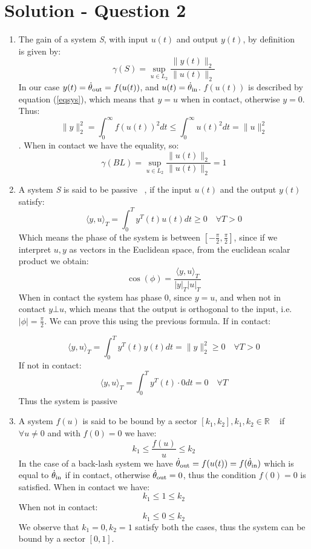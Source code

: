 \section*{Solution - Question 2}
\label{sec:sol2}
\begin{enumerate}
\item{
The gain of a system \textit{S}, with input $u(t)$ and output $y(t)$, by definition ~\cite[p. 209]{Khalil:2002:Nonlinear-systems:vh} is given by:
$$ \gamma(S) = \sup_{u \in L_2} \frac{\|y(t)\|_2}{\|u(t)\|_2}$$
In our case $y(t) = \operatorname{\dot{\theta}_\textrm{out}}=f(u(t))$, and $u(t) = \operatorname{\dot{\theta}_\textrm{in}}$. $f(u(t))$ is described by equation (\ref{eqsys}), which means that $y=u$ when in contact, otherwise $y=0$.
Thus: $$\|y\|_2^2 = \int_0^\infty f(u(t))^2 dt \leq \int_0^\infty u(t)^2 dt = \|u\|_2^2$$. When in contact we have the equality, so:
$$\gamma(BL) = \sup_{u \in L_2} \frac{\|u(t)\|_2}{\|u(t)\|_2} = 1$$}
\item{A system \emph{S} is said to be passive ~\cite[p. 227]{Khalil:2002:Nonlinear-systems:vh}, if the input $u(t)$ and the output $y(t)$ satisfy:
$$\langle y,u \rangle_T = \int_0^T y^T(t)u(t) dt \geq 0 \quad \forall
T > 0$$
Which means  the phase of the system is between $[-\frac{\pi}{2},\frac{\pi}{2}]$, since if we interpret $u,y$ as vectors in the Euclidean space, from the euclidean scalar product we obtain:
$$\cos(\phi)  = \frac{\langle y,u \rangle_T }{|y|_T|u|_T}$$
When in contact the system has phase $0$, since $y=u$, and when not in contact $y \bot u$, which means that the output is orthogonal to the input, i.e. $|\phi| = \frac{\pi}{2}$. We can prove this using the previous formula. If in contact:

$$\langle y,u \rangle_T = \int_0^T y^T(t)y(t) dt = \|y\|_2^2 \geq 0 \quad \forall
T > 0$$
If not in contact: 
$$\langle y,u \rangle_T = \int_0^T y^T(t)\cdot 0 dt =0 \quad \forall T$$
Thus the system is passive}
\item{A system $f(u)$ is said to be bound by a sector  $[k_1,k_2], k_1,k_2 \in \mathbb{R}$ ~\cite[p. 264]{Khalil:2002:Nonlinear-systems:vh} if $\forall u \neq 0$ and with $f(0)=0$ we have:
$$k_1 \leq \frac{f(u)}{u} \leq k_2 $$
In the case of a back-lash system we have $\operatorname{\dot{\theta}_\textrm{out}}=f(u(t))=f(\operatorname{\dot{\theta}_\textrm{in}})$ which is equal to $\operatorname{\dot{\theta}_\textrm{in}}$ if in contact, otherwise $\operatorname{\dot{\theta}_\textrm{out}}=0$, thus the condition $f(0)=0$ is satisfied.
When in contact we have:
$$k_1 \leq 1 \leq k_2$$
When not in contact:
$$k_1 \leq 0 \leq k_2$$
We observe that $k_1=0, k_2=1$ satisfy both the cases, thus the system can be bound by a sector $[0,1]$.
}
\end{enumerate}